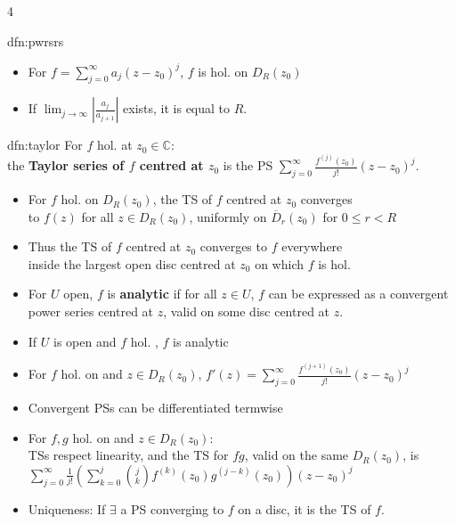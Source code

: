 \documentclass[landscape, 8pt]{extarticle}
\begin{document}
\begin{multicols*}{4}
\begin{dfn}{dfn:pwrsrs}{ }
			\begin{itemize}
				\item For $f = \sum_{j=0}^{\infty}a_j (z-z_0)^j$, $f$ is hol. on $D_R(z_0)$
				\item If $\lim_{j\to \infty}\left|\frac{a_j}{a_{j+1}}\right|$ exists, it is equal to $R$.
			\end{itemize}
			
		\end{dfn}
		
		
		\begin{dfn}{dfn:taylor}{ }
			For $f$ hol. at $z_0 \in \mathbb{C}$: \\ \vspace{-5pt}
			the \textbf{Taylor series of $f$ centred at $z_0$} is the PS $\sum_{j=0}^{\infty}\frac{f^{(j)}(z_0)}{j!}(z-z_0)^j$.
			\begin{itemize}
				\item For $f$ hol. on $D_R(z_0)$, the TS of $f$ centred at $z_0$ converges \\
				to $f(z)$ for all $z \in D_R(z_0)$, uniformly on $\overline{D}_r(z_0)$ for $0 \le r < R$ 
				\item Thus the TS of $f$ centred at $z_0$ converges to $f$ everywhere\\
				inside the largest open disc centred at $z_0$ on which $f$ is hol.
				\item For $U$ open, $f$ is \textbf{analytic} if for all $z\in U$, $f$ can be expressed as a convergent power series centred at $z$, valid on some disc centred at $z$.
				\item If $U$ is open and $f$ hol. , $f$ is analytic
				\item For $f$ hol. on and $z \in D_R(z_0)$, $f'(z) = \sum_{j=0}^{\infty}\frac{f^{(j+1)}(z_0)}{j!}(z-z_0)^j$
				\item Convergent PSs can be differentiated termwise
				\item For $f, g$ hol. on and $z \in D_R(z_0)$: \\
				TSs respect linearity, and the TS for $fg$, valid on the same $D_R(z_0)$, is $\sum_{j=0}^{\infty}\frac{1}{j!}\left( \sum_{k=0}^{j} \binom{j}{k} f^{(k)}(z_0) g^{(j-k)}(z_0)\right)(z-z_0)^j$
				\item Uniqueness: If $\exists$ a PS converging to $f$ on a disc, it is the TS of $f$.
			\end{itemize}
			
			
		\end{dfn}
		

\end{multicols*}
\end{document}
